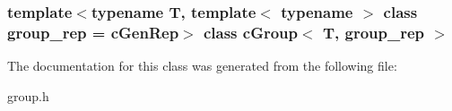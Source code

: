 \subsubsection*{template$<$typename T, template$<$ typename $>$ class group\-\_\-rep = c\-Gen\-Rep$>$ class c\-Group$<$ T, group\-\_\-rep $>$}



\-The documentation for this class was generated from the following file\-:\begin{DoxyCompactItemize}
\item 
group.\-h\end{DoxyCompactItemize}
